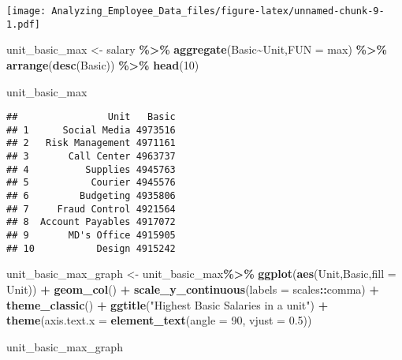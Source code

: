 \documentclass[
]{article}
\newenvironment{Shaded}{\begin{snugshade}}{\end{snugshade}}
\newcommand{\AttributeTok}[1]{\textcolor[rgb]{0.13,0.29,0.53}{#1}}
\newcommand{\DecValTok}[1]{\textcolor[rgb]{0.00,0.00,0.81}{#1}}
\newcommand{\FloatTok}[1]{\textcolor[rgb]{0.00,0.00,0.81}{#1}}
\newcommand{\FunctionTok}[1]{\textcolor[rgb]{0.13,0.29,0.53}{\textbf{#1}}}
\newcommand{\NormalTok}[1]{#1}
\newcommand{\OtherTok}[1]{\textcolor[rgb]{0.56,0.35,0.01}{#1}}
\newcommand{\SpecialCharTok}[1]{\textcolor[rgb]{0.81,0.36,0.00}{\textbf{#1}}}
\newcommand{\StringTok}[1]{\textcolor[rgb]{0.31,0.60,0.02}{#1}}
\begin{document}
\texttt{[image: Analyzing\_Employee\_Data\_files/figure-latex/unnamed-chunk-9-1.pdf]}

\begin{Shaded}
\begin{Highlighting}[]
\NormalTok{unit\_basic\_max }\OtherTok{\textless{}{-}}\NormalTok{ salary }\SpecialCharTok{\%\textgreater{}\%} 
  \FunctionTok{aggregate}\NormalTok{(Basic}\SpecialCharTok{\textasciitilde{}}\NormalTok{Unit,}\AttributeTok{FUN =}\NormalTok{ max) }\SpecialCharTok{\%\textgreater{}\%} 
  \FunctionTok{arrange}\NormalTok{(}\FunctionTok{desc}\NormalTok{(Basic)) }\SpecialCharTok{\%\textgreater{}\%} 
  \FunctionTok{head}\NormalTok{(}\DecValTok{10}\NormalTok{)}


\NormalTok{unit\_basic\_max}
\end{Highlighting}
\end{Shaded}

\begin{verbatim}
##                Unit   Basic
## 1      Social Media 4973516
## 2   Risk Management 4971161
## 3       Call Center 4963737
## 4          Supplies 4945763
## 5           Courier 4945576
## 6         Budgeting 4935806
## 7     Fraud Control 4921564
## 8  Account Payables 4917072
## 9       MD's Office 4915905
## 10           Design 4915242
\end{verbatim}

\begin{Shaded}
\begin{Highlighting}[]
\NormalTok{unit\_basic\_max\_graph }\OtherTok{\textless{}{-}}\NormalTok{ unit\_basic\_max}\SpecialCharTok{\%\textgreater{}\%} 
  \FunctionTok{ggplot}\NormalTok{(}\FunctionTok{aes}\NormalTok{(Unit,Basic,}\AttributeTok{fill =}\NormalTok{ Unit)) }\SpecialCharTok{+} 
  \FunctionTok{geom\_col}\NormalTok{() }\SpecialCharTok{+}
  \FunctionTok{scale\_y\_continuous}\NormalTok{(}\AttributeTok{labels =}\NormalTok{ scales}\SpecialCharTok{::}\NormalTok{comma)  }\SpecialCharTok{+} 
  \FunctionTok{theme\_classic}\NormalTok{() }\SpecialCharTok{+} 
  \FunctionTok{ggtitle}\NormalTok{(}\StringTok{"Highest Basic Salaries in a unit"}\NormalTok{) }\SpecialCharTok{+} 
  \FunctionTok{theme}\NormalTok{(}\AttributeTok{axis.text.x =} \FunctionTok{element\_text}\NormalTok{(}\AttributeTok{angle =} \DecValTok{90}\NormalTok{, }\AttributeTok{vjust =} \FloatTok{0.5}\NormalTok{))}


\NormalTok{unit\_basic\_max\_graph}
\end{Highlighting}
\end{Shaded}
\end{document}
